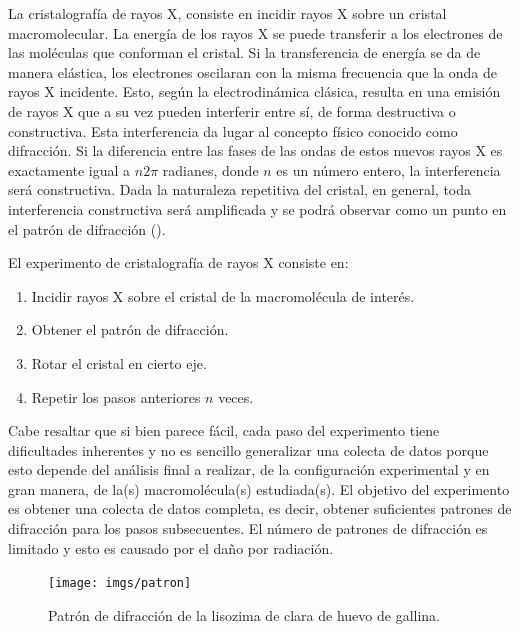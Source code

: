 La cristalografía de rayos X, consiste en incidir rayos X sobre un cristal macromolecular. La energía de los rayos X se puede transferir a los electrones de las moléculas que conforman el cristal. Si la transferencia de energía se da de manera elástica, los electrones oscilaran con la misma frecuencia que la onda de rayos X incidente. Esto, según la electrodinámica clásica, resulta en una emisión de rayos X que a su vez pueden interferir entre sí, de forma destructiva o constructiva. Esta interferencia da lugar al concepto físico conocido como difracción. Si la diferencia entre las fases de las ondas de estos nuevos rayos X es exactamente igual a $n2\pi$ radianes, donde $n$ es un número entero, la interferencia será constructiva. Dada la naturaleza repetitiva del cristal, en general, toda interferencia constructiva será amplificada y se podrá observar como un punto en el patrón de difracción ().

El experimento de cristalografía de rayos X consiste en:

\begin{enumerate}
	\item Incidir rayos X sobre el cristal de la macromolécula de interés. 
	\item Obtener el patrón de difracción. 
	\item Rotar el cristal en cierto eje. 
	\item Repetir los pasos anteriores $n$ veces.
\end{enumerate}

Cabe resaltar que si bien parece fácil, cada paso del experimento tiene dificultades inherentes y no es sencillo generalizar una colecta de datos porque esto depende del análisis final a realizar, de la configuración experimental y en gran manera, de la(s) macromolécula(s) estudiada(s). El objetivo del experimento es obtener una colecta de datos completa, es decir, obtener suficientes patrones de difracción para los pasos subsecuentes. El número de patrones de difracción es limitado y esto es causado por el daño por radiación.

\begin{figure}[hb]
	\texttt{[image: imgs/patron]}
	\caption[Patrón de difracción]{Patrón de difracción de la lisozima de clara de huevo de gallina.}
\end{figure}

